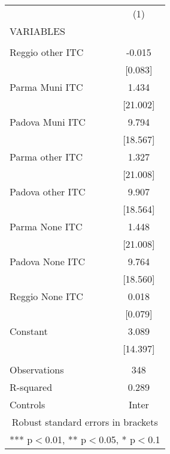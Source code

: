 \begin{tabular}{lc} \hline
 & (1) \\
VARIABLES &  \\ \hline
 &  \\
Reggio other ITC & -0.015 \\
 & [0.083] \\
Parma Muni ITC & 1.434 \\
 & [21.002] \\
Padova Muni ITC & 9.794 \\
 & [18.567] \\
Parma other ITC & 1.327 \\
 & [21.008] \\
Padova other ITC & 9.907 \\
 & [18.564] \\
Parma None ITC & 1.448 \\
 & [21.008] \\
Padova None ITC & 9.764 \\
 & [18.560] \\
Reggio None ITC & 0.018 \\
 & [0.079] \\
Constant & 3.089 \\
 & [14.397] \\
 &  \\
Observations & 348 \\
R-squared & 0.289 \\
 Controls & Inter \\ \hline
\multicolumn{2}{c}{ Robust standard errors in brackets} \\
\multicolumn{2}{c}{ *** p$<$0.01, ** p$<$0.05, * p$<$0.1} \\
\end{tabular}
